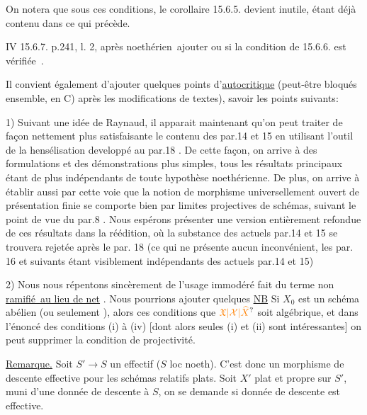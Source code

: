 \handwritten{$\Bigg($}On notera que sous ces conditions, le  corollaire 15.6.5.
devient inutile, étant déjà contenu dans ce qui précède.

IV 15.6.7. p.241, l. 2, après \textquotedbl noethérien\textquotedbl\ ajouter \textquotedbl ou si la condition
 de 15.6.6. est vérifiée\textquotedbl\ .

Il convient également d'ajouter quelques points d'\uline{autocritique}
(peut-être bloqués ensemble, en C) après les \textquotedbl modifications de textes),
savoir les points suivants:

1\textordmasculine) Suivant une idée de Raynaud, il apparait maintenant qu'on peut
traiter de façon nettement plus satisfaisante le contenu des par.14 et
15 en utilisant l'outil de la hensélisation developpé au par.18 .
De cette façon, on arrive à des formulations et des démonstrations plus
simples, tous les résultats principaux étant de plus indépendants de toute hypothèse noethérienne. De plus, on arrive à établir aussi par cette
voie que la notion de morphisme universellement ouvert  de
présentation finie se comporte bien par limites projectives de schémas,
suivant le point de vue du par.8 . Nous espérons présenter une version
entièrement refondue de ces résultats dans la réédition, où 
la substance des actuels par.14 et 15 se trouvera rejetée après le par.
18 (ce qui ne présente aucun inconvénient, les par. 16 et suivants
étant visiblement indépendants des actuels par.14 et 15)

2\textordmasculine) Nous nous répentons sincèrement de l'usage immodéré fait du
terme \textquotedbl non \uline{ramifié\textquotedbl\ au lieu de \textquotedbl net\textquotedbl} . Nous pourrions ajouter quelques
\uline{NB} Si $X_0$ est un schéma abélien  (ou seulement
), alors ces conditions   que
$\unsure{\mathfrak X|\mathcal X|\widehat X}$ soit algébrique, et dans l'énoncé des conditions
(i) à (iv) [dont alors seules (i) et (ii) sont intéressantes]
on peut supprimer la condition de projectivité.

\uline{Remarque.} Soit $S'\to S$ un  
effectif ($S$ loc noeth). C'est donc un morphisme
de descente effective pour les schémas relatifs plats.
Soit $X'$ plat et propre sur $S'$, muni d'une donnée de
descente à $S$, on  se demande si donnée
de descente est effective.

